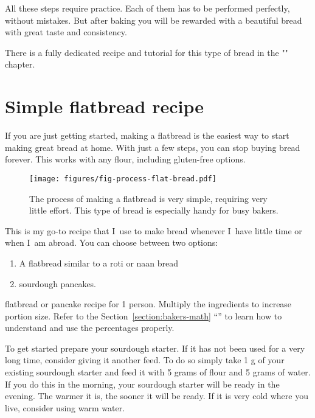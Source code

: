 All these steps require practice. Each of them has to be
performed perfectly, without mistakes.
But after baking you will be rewarded with a beautiful bread
with great taste and consistency.

There is a fully dedicated recipe and tutorial
for this type of bread in the "" chapter.

\section{Simple flatbread recipe}
\label{section:flat-bread-recipe}

If you are just getting started, making a flatbread is the
easiest way to start making great bread at home. With just a
few steps, you can stop buying bread forever. This works with
any flour, including gluten-free options.

\begin{figure}[!htb]
  \texttt{[image: figures/fig-process-flat-bread.pdf]}
  \caption{The process of making a flatbread is very simple, requiring very little effort. This
  type of bread is especially handy for busy bakers.}
  \label{fig:flat-bread-process}
\end{figure}

This is my go-to recipe that I~use to make bread whenever
I~have little time or when I~am abroad. You can choose
between two options:
%
\begin{enumerate}
    \item A flatbread similar to a roti or naan bread
    \item sourdough pancakes.
\end{enumerate}

\begin{table}[!htb]
    \begin{center}
        
        \caption{\label{tab:flat-bread-ingredients}flatbread or pancake recipe
            for 1 person. Multiply the ingredients to increase portion size.
            Refer to the Section~\ref{section:bakers-math}
            ``'' to learn how to understand and
            use the percentages properly.}
    \end{center}
\end{table}

To get started prepare your sourdough starter. If it has not been used for a very
long time, consider giving it another feed. To do so simply take 1 g of your
existing sourdough starter and feed it with 5 grams of flour and 5 grams of water.
If you do this in the morning, your sourdough starter will be ready in the evening. The
warmer it is, the sooner it will be ready. If it is very cold where you live, consider
using warm water.

